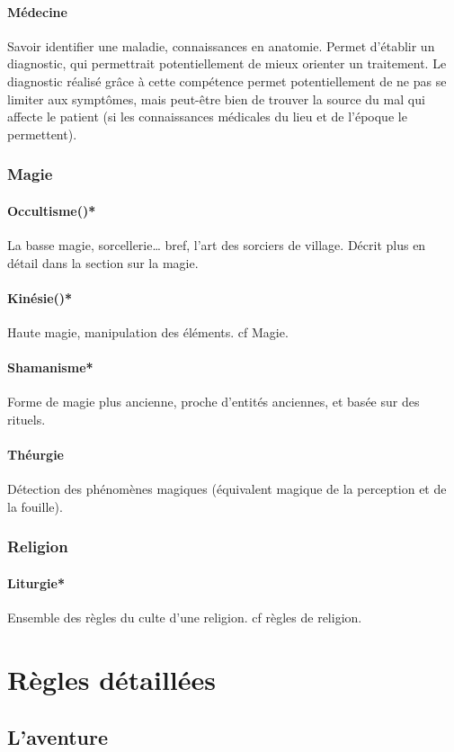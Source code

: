 \documentclass[10pt,a4paper,twocolumn]{book}
\begin{document}
\subsubsection{Médecine}
Savoir identifier une maladie, connaissances en anatomie. Permet d'établir un diagnostic, qui permettrait potentiellement de mieux orienter un traitement. Le diagnostic réalisé grâce à cette compétence permet potentiellement de ne pas se limiter aux symptômes, mais peut-être bien de trouver la source du mal qui affecte le patient (si les connaissances médicales du lieu et de l'époque le permettent).
\subsection{Magie}
\subsubsection{Occultisme()*}
La basse magie, sorcellerie… bref, l’art des sorciers de village. Décrit plus en détail dans la section sur la magie.
\subsubsection{Kinésie()*}
Haute magie, manipulation des éléments. cf Magie.
\subsubsection{Shamanisme*}
Forme de magie plus ancienne, proche d’entités anciennes, et basée sur des rituels.
\subsubsection{Théurgie}
Détection des phénomènes magiques (équivalent magique de la perception et de la fouille).
\subsection{Religion}
\subsubsection{Liturgie*}
Ensemble des règles du culte d’une religion. cf règles de religion.

\chapter{Règles détaillées}

\section{L'aventure}
\end{document}

